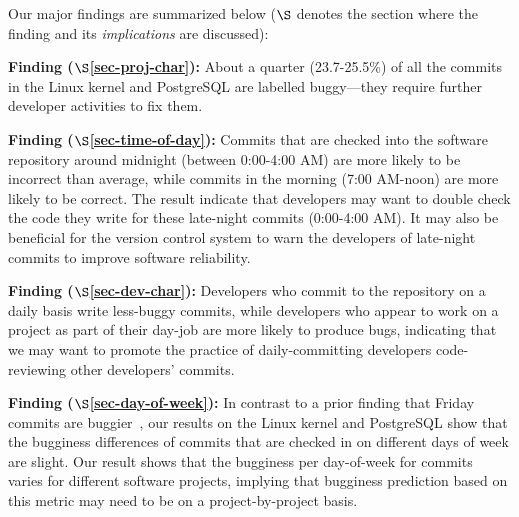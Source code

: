 Our major findings are summarized below ($\S$ denotes the section where the
finding and its {\em implications} are discussed):

\begin{list}{}{\topsep=0pt\parsep=0pt\leftmargin=9pt\itemindent=0pt}

\item {\bf Finding \fbuggy ($\S$\ref{sec-proj-char}):} 
About a quarter (23.7-25.5\%) of all the commits in the Linux kernel and
PostgreSQL are labelled buggy---they require further developer activities to fix
them.

\item {\bf Finding \fhour ($\S$\ref{sec-time-of-day}):} 
Commits that are checked into the software repository around midnight (between
0:00-4:00 AM) are more likely to be incorrect than average, while commits in the
morning (7:00 AM-noon) are more likely to be correct.  The result indicate that
developers may want to double check the code they write for these late-night
commits (0:00-4:00 AM).  It may also be beneficial for the version control
system to warn the developers of late-night commits to improve software
reliability.

\item {\bf Finding \fdaily ($\S$\ref{sec-dev-char}):} 
Developers who commit to the repository on a daily basis write less-buggy
commits, while developers who appear to work on a project as part of their
day-job are more likely to produce bugs, indicating that we may want to promote
the practice of daily-committing developers code-reviewing other developers'
commits.

\item {\bf Finding \fday ($\S$\ref{sec-day-of-week}):} 
In contrast to a prior finding that Friday commits are
buggier~\cite{sliwerski-msr-2005}, our results on the Linux kernel and
PostgreSQL show that the bugginess differences of commits that are checked in on
different days of week are slight. Our result shows that the bugginess per
day-of-week for commits varies for different software projects, implying that
bugginess prediction based on this metric may need to be on a project-by-project
basis.

\end{list}
